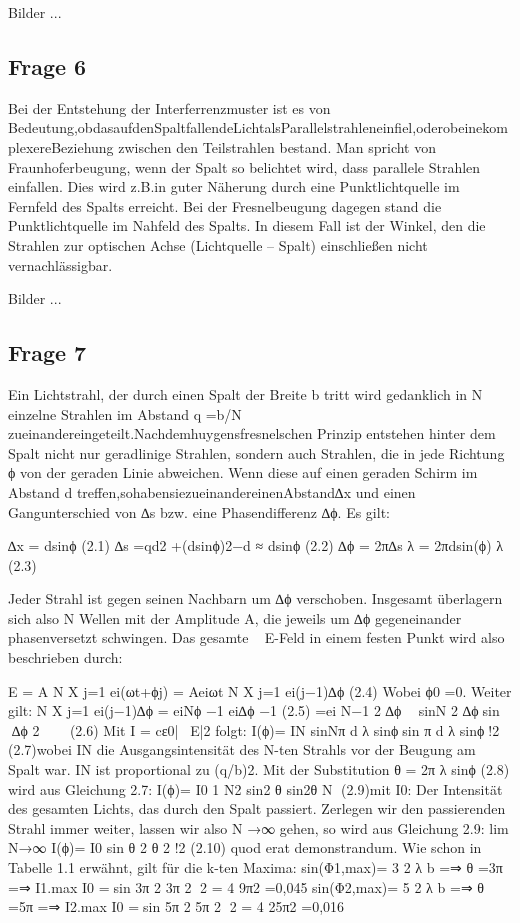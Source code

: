 \documentclass[a4paper,10pt]{scrartcl}
\begin{document}
Bilder ...
		\subsection{Frage 6}
		Bei der Entstehung der Interferrenzmuster ist es von Bedeutung,obdasaufdenSpaltfallendeLichtalsParallelstrahleneinﬁel,oderobeinekomplexereBeziehung zwischen den Teilstrahlen bestand.
Man spricht von Fraunhoferbeugung, wenn der Spalt so belichtet wird, dass parallele Strahlen einfallen. Dies wird z.B.in guter Näherung durch eine Punktlichtquelle im Fernfeld des Spalts erreicht. Bei der Fresnelbeugung dagegen stand die Punktlichtquelle im Nahfeld des Spalts. In diesem Fall ist der Winkel, den die Strahlen zur optischen Achse (Lichtquelle – Spalt) einschließen nicht vernachlässigbar.

Bilder ...
			
							 			\subsection{Frage 7}
Ein Lichtstrahl, der durch einen Spalt der Breite b tritt wird gedanklich in N einzelne Strahlen im Abstand q =b/N zueinandereingeteilt.Nachdemhuygensfresnelschen Prinzip entstehen hinter dem Spalt nicht nur geradlinige Strahlen, sondern auch Strahlen, die in jede Richtung ϕ von der geraden Linie abweichen. Wenn diese auf einen geraden Schirm im Abstand d treﬀen,sohabensiezueinandereinenAbstand∆x und einen Gangunterschied von ∆s bzw. eine Phasendiﬀerenz ∆ϕ. Es gilt:

	∆x = dsinϕ (2.1) ∆s =qd2 +(dsinϕ)2−d ≈ dsinϕ (2.2) ∆ϕ = 2π∆s λ = 2πdsin(ϕ) λ (2.3)
	
Jeder Strahl ist gegen seinen Nachbarn um ∆ϕ verschoben. Insgesamt überlagern sich also N Wellen mit der Amplitude A, die jeweils um ∆ϕ gegeneinander phasenversetzt schwingen. Das gesamte ~ E-Feld in einem festen Punkt wird also beschrieben durch:

E = A
N X j=1
ei(ωt+ϕj) = Aeiωt
N X j=1
ei(j−1)∆ϕ (2.4)
Wobei ϕ0 =0. Weiter gilt:
N X j=1
ei(j−1)∆ϕ = eiNϕ −1 ei∆ϕ −1 (2.5) =ei N−1 2 ∆ϕ  sinN 2 ∆ϕsin ∆ϕ 2    (2.6)
Mit I = cε0|~ E|2 folgt:
I(ϕ)= IN sinNπ d λ sinϕsin π d λ sinϕ!2 (2.7)wobei IN die Ausgangsintensität des N-ten Strahls vor der Beugung am Spalt war. IN ist proportional zu (q/b)2. Mit der Substitution θ = 2π λ sinϕ (2.8) wird aus Gleichung 2.7: I(ϕ)= I0 1 N2 sin2 θ sin2θ N (2.9)mit I0: Der Intensität des gesamten Lichts, das durch den Spalt passiert. Zerlegen wir den passierenden Strahl immer weiter, lassen wir also N →∞ gehen, so wird aus Gleichung 2.9:
lim N→∞
I(ϕ)= I0 sin θ 2 θ 2 !2 (2.10)
quod erat demonstrandum. Wie schon in Tabelle 1.1 erwähnt, gilt für die k-ten Maxima: sin(Φ1,max)= 3 2 λ b =⇒ θ =3π =⇒ I1.max I0 =sin 3π 2 3π 2 2 = 4 9π2 =0,045 sin(Φ2,max)= 5 2 λ b =⇒ θ =5π =⇒ I2.max I0 =sin 5π 2 5π 2 2 = 4 25π2 =0,016
\end{document}
